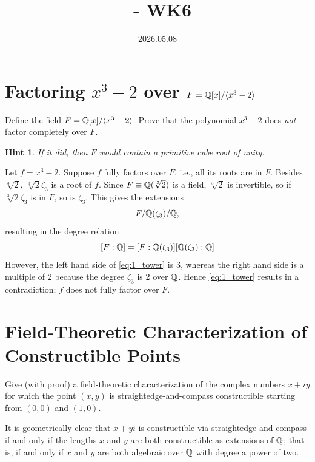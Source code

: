 \documentclass[12pt]{article}
\title{\course\ - WK6}
\author{\myname}
\date{2026.05.08}
\begin{document}
\maketitle
\thispagestyle{fancy}

\newtheorem*{hint}{Hint}

\section{Factoring \texorpdfstring{$x^3-2$}{x\^{}3-2} over \texorpdfstring{$F = \mathbb{Q}[x]/\langle x^3-2\rangle$}{F}}
 
Define the field $F = \mathbb{Q}[x]/\langle x^3-2\rangle$. Prove that the polynomial $x^3-2$ does \emph{not} factor completely over $F$.
 
\begin{hint}
If it did, then $F$ would contain a primitive cube root of unity.
\end{hint}

\noindent\dotfill 

Let $f = x^3 - 2$. 
Suppose $f$ fully factors over $F$, i.e., all its roots are in $F$. 
Besides $\sqrt[3]{2}$, $\sqrt[3]{2} \zeta_3$ is a root of $f$. 
Since $F \equiv \Q(\sqrt[3]{2})$ is a field, $\sqrt[3]{2}$ is invertible, so if $\sqrt[3]{2}\zeta_3$ is in $F$, so is $\zeta_3$. 
This gives the extensions 
$$F / \mathbb{Q}(\zeta_3) / \mathbb{Q},$$
resulting in the degree relation 
\begin{equation} \label{eq:1_tower}
  [F : \mathbb{Q}] = [F : \mathbb{Q}(\zeta_3)] [\mathbb{Q}(\zeta_3) : \mathbb{Q}]
\end{equation}
However, the left hand side of \eqref{eq:1_tower} is 3, whereas the right hand side is a multiple of 2 because the degree $\zeta_3$ is 2 over $\mathbb{Q}$. 
Hence \eqref{eq:1_tower} results in a contradiction; 
$f$ does not fully factor over $F$.

 
\section{Field-Theoretic Characterization of Constructible Points}
 
Give (with proof) a field-theoretic characterization of the complex numbers $x+iy$ for which the point $(x,y)$ is straightedge-and-compass constructible starting from $(0,0)$ and $(1,0)$.

\noindent\dotfill 

It is geometrically clear that $x + yi$ is constructible via straightedge-and-compass if and only if the lengths $x$ and $y$ are both constructible as extensions of $\mathbb{Q}$; 
that is, if and only if $x$ and $y$ are both algebraic over $\mathbb{Q}$ with degree a power of two. 
\end{document}
